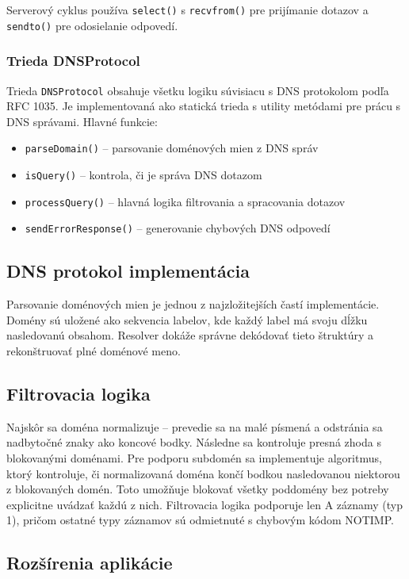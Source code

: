 \documentclass[12pt,a4paper]{article}
\begin{document}
Serverový cyklus používa \texttt{select()} s \texttt{recvfrom()} pre prijímanie dotazov a \texttt{sendto()} pre odosielanie odpovedí.

\subsubsection{Trieda DNSProtocol}

Trieda \texttt{DNSProtocol} obsahuje všetku logiku súvisiacu s DNS protokolom podľa RFC 1035. Je implementovaná ako statická trieda s utility metódami pre prácu s DNS správami. Hlavné funkcie:

\begin{itemize}
    \item \texttt{parseDomain()} -- parsovanie doménových mien z DNS správ
    \item \texttt{isQuery()} -- kontrola, či je správa DNS dotazom
    \item \texttt{processQuery()} -- hlavná logika filtrovania a spracovania dotazov
    \item \texttt{sendErrorResponse()} -- generovanie chybových DNS odpovedí
\end{itemize}

\subsection{DNS protokol implementácia}

Parsovanie doménových mien je jednou z najzložitejších častí implementácie. Domény sú uložené ako sekvencia labelov, kde každý label má svoju dĺžku nasledovanú obsahom. Resolver dokáže správne dekódovať tieto štruktúry a rekonštruovať plné doménové meno.

\subsection{Filtrovacia logika}

Najskôr sa doména normalizuje -- prevedie sa na malé písmená a odstránia sa nadbytočné znaky ako koncové bodky. Následne sa kontroluje presná zhoda s blokovanými doménami. Pre podporu subdomén sa implementuje algoritmus, ktorý kontroluje, či normalizovaná doména končí bodkou nasledovanou niektorou z blokovaných domén. Toto umožňuje blokovať všetky poddomény bez potreby explicitne uvádzať každú z nich. Filtrovacia logika podporuje len A záznamy (typ 1), pričom ostatné typy záznamov sú odmietnuté s chybovým kódom NOTIMP.

\subsection{Rozšírenia aplikácie}
\end{document}
